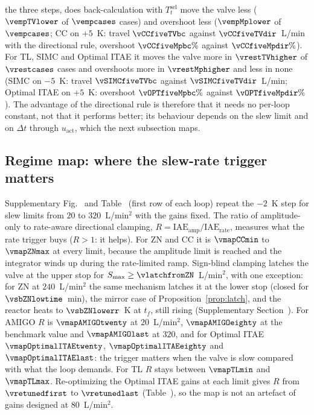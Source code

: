 the three steps, does back-calculation with $T_t^{\mathrm{sel}}$ move the valve less ($\vempTVlower$ of $\vempcases$ cases) and overshoot less ($\vempMplower$ of $\vempcases$; CC on $+5$~K: travel $\vCCfiveTVbc$ against $\vCCfiveTVdir$~L/min with the directional rule, overshoot $\vCCfiveMpbc\%$ against $\vCCfiveMpdir\%$). For TL, SIMC and Optimal ITAE it moves the valve more in $\vrestTVhigher$ of $\vrestcases$ cases and overshoots more in $\vrestMphigher$ and less in none (SIMC on $-5$~K: travel $\vSIMCfiveTVbc$ against $\vSIMCfiveTVdir$~L/min; Optimal ITAE on $+5$~K: overshoot $\vOPTfiveMpbc\%$ against $\vOPTfiveMpdir\%$). The advantage of the directional rule is therefore that it needs no per-loop constant, not that it performs better; its behaviour depends on the slew limit and on $\Delta t$ through $u_{\text{act}}$, which the next subsection maps.






\subsection{Regime map: where the slew-rate trigger matters}
\label{subsec:regime}
Supplementary Fig.~ and Table~ (first row of each loop) repeat the $-2$~K step for slew limits from $20$ to $320$~L/min$^2$ with the gains fixed. The ratio of amplitude-only to rate-aware directional clamping, $R = \mathrm{IAE}_{\mathrm{amp}}/\allowbreak\mathrm{IAE}_{\mathrm{rate}}$, measures what the rate trigger buys ($R > 1$: it helps). For ZN and CC it is $\vmapCCmin$ to $\vmapZNmax$ at every limit, because the amplitude limit is reached and the integrator winds up during the rate-limited ramp. Sign-blind clamping latches the valve at the upper stop for $S_{\max} \ge \vlatchfromZN$~L/min$^2$, with one exception: for ZN at $240$~L/min$^2$ the same mechanism latches it at the lower stop (closed for $\vsbZNlowtime$~min), the mirror case of Proposition~\ref{prop:latch}, and the reactor heats to $\vsbZNlowerr$~K at $t_f$, still rising (Supplementary Section~). For AMIGO $R$ is $\vmapAMIGOtwenty$ at $20$~L/min$^2$, $\vmapAMIGOeighty$ at the benchmark value and $\vmapAMIGOlast$ at $320$, and for Optimal ITAE $\vmapOptimalITAEtwenty$, $\vmapOptimalITAEeighty$ and $\vmapOptimalITAElast$: the trigger matters when the valve is slow compared with what the loop demands. For TL $R$ stays between $\vmapTLmin$ and $\vmapTLmax$. Re-optimizing the Optimal ITAE gains at each limit gives $R$ from $\vretunedfirst$ to $\vretunedlast$ (Table~), so the map is not an artefact of gains designed at $80$~L/min$^2$.


